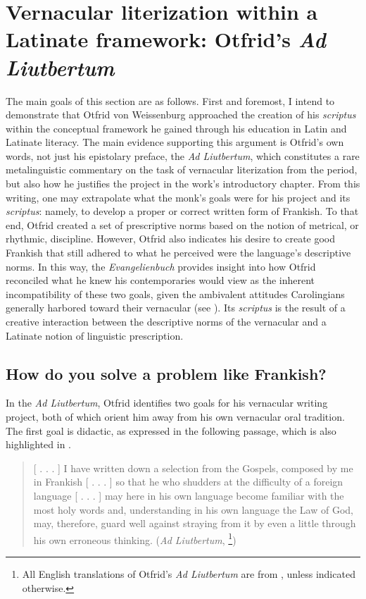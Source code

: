 \section{Vernacular literization within a Latinate framework: Otfrid’s \textit{Ad Liutbertum}}\label{sec:5.2}

The main goals of this section are as follows. First and foremost, I intend to demonstrate that Otfrid von Weissenburg approached the creation of his \textit{scriptus} within the conceptual framework he gained through his education in Latin and Latinate literacy. The main evidence supporting this argument is Otfrid’s own words, not just his epistolary preface, the \textit{Ad Liutbertum}, which constitutes a rare metalinguistic commentary on the task of vernacular literization from the period, but also how he justifies the project in the work’s introductory chapter. From this writing, one may extrapolate what the monk’s goals were for his project and its \textit{scriptus}: namely, to develop a proper or correct written form of Frankish. To that end, Otfrid created a set of prescriptive norms based on the notion of metrical, or rhythmic, discipline. However, Otfrid also indicates his desire to create good Frankish that still adhered to what he perceived were the language’s descriptive norms. In this way, the \textit{Evangelienbuch} provides insight into how Otfrid reconciled what he knew his contemporaries would view as the inherent incompatibility of these two goals, given the ambivalent attitudes Carolingians generally harbored toward their vernacular (see ). Its \textit{scriptus} is the result of a creative interaction between the descriptive norms of the vernacular and a Latinate notion of linguistic prescription.

\subsection{How do you solve a problem like Frankish? }\label{sec:5.2.1}
\begin{sloppypar}
In the \textit{Ad Liutbertum}, Otfrid identifies two goals for his vernacular writing project, both of which orient him away from his own vernacular oral tradition. The first goal is didactic, as expressed in the following passage, which is also highlighted in \citet[37]{Somers2021b}.
\end{sloppypar}

\begin{quote}
[ . . . ] I have written down a selection from the Gospels, composed by me in Frankish [ . . . ] so that he who shudders at the difficulty of a foreign language [ . . . ] may here in his own language become familiar with the most holy words and, understanding in his own language the Law of God, may, therefore, guard well against straying from it by even a little through his own erroneous thinking.  (\textit{Ad Liutbertum}, \citealt[875--876]{Magoun1943}\footnote{\textrm{All English translations of Otfrid’s} \textrm{\textit{Ad Liutbertum}} \textrm{are from \citet{Magoun1943}, unless indicated otherwise.} })
\end{quote}

